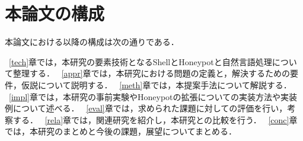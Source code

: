 \section{本論文の構成}
\label{intr:kosei}
本論文における以降の構成は次の通りである．

~\ref{tech}章では，本研究の要素技術となるShellとHoneypotと自然言語処理について整理する．
~\ref{appr}章では，本研究における問題の定義と，解決するための要件，仮説について説明する．
~\ref{meth}章では，本提案手法について解説する．
~\ref{impl}章では，本研究の事前実験やHoneypotの拡張についての実装方法や実装例について述べる．
~\ref{eval}章では，求められた課題に対しての評価を行い，考察する．
~\ref{rela}章では，関連研究を紹介し，本研究との比較を行う．
~\ref{conc}章では，本研究のまとめと今後の課題，展望についてまとめる．


